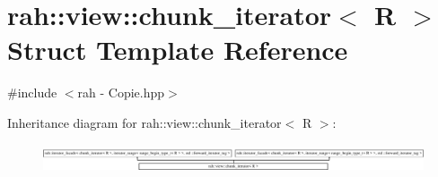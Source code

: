\hypertarget{structrah_1_1view_1_1chunk__iterator}{}\section{rah\+::view\+::chunk\+\_\+iterator$<$ R $>$ Struct Template Reference}
\label{structrah_1_1view_1_1chunk__iterator}


{\ttfamily \#include $<$rah -\/ Copie.\+hpp$>$}

Inheritance diagram for rah\+::view\+::chunk\+\_\+iterator$<$ R $>$\+:\begin{figure}[H]
\begin{center}
\leavevmode
\includegraphics[height=0.828402cm]{structrah_1_1view_1_1chunk__iterator}
\end{center}
\end{figure}
